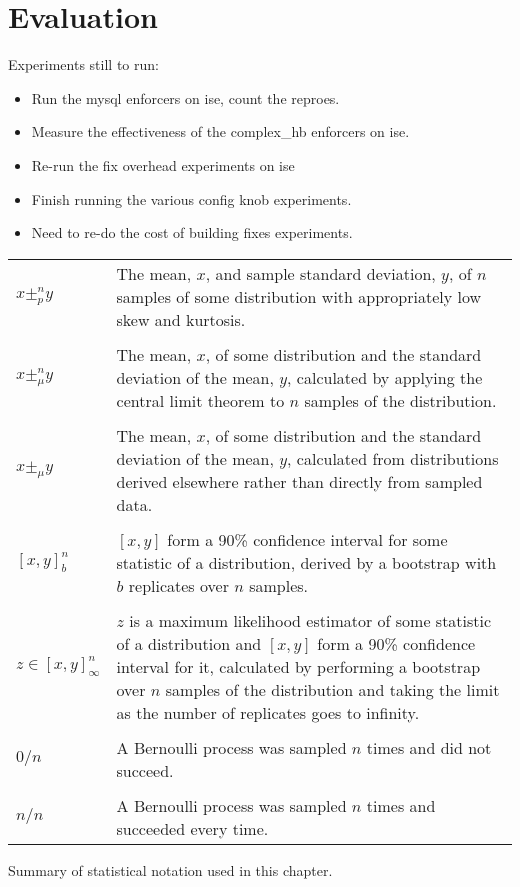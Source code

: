 \newcommand{\biggraph}[1]{}

\chapter{Evaluation}
\label{chapter:eval}

Experiments still to run:

\begin{itemize}
\item Run the mysql enforcers on ise, count the reproes.
\item Measure the effectiveness of the complex\_hb enforcers on ise.
\item Re-run the fix overhead experiments on ise
\item Finish running the various config knob experiments.
\item Need to re-do the cost of building fixes experiments.
\end{itemize}

\begin{sanefig}
  \begin{tabular}{lp{12.7cm}}
    $x \pm^n_p y$ & The mean, $x$, and sample standard deviation, $y$, of $n$ samples of some distribution with appropriately low skew and kurtosis.\\
    & \\
    $x \pm^n_\mu y$ & The mean, $x$, of some distribution and the standard deviation of the mean, $y$, calculated by applying the central limit theorem to $n$ samples of the distribution.\\
    & \\
    $x \pm_\mu y$ & The mean, $x$, of some distribution and the standard deviation of the mean, $y$, calculated from distributions derived elsewhere rather than directly from sampled data.\\
    & \\
    $[x,y]^n_b$ & $[x,y]$ form a 90\% confidence interval for some statistic of a distribution, derived by a bootstrap with $b$ replicates over $n$ samples. \\
    & \\
    $z \in [x,y]^n_\infty$ & $z$ is a maximum likelihood estimator of some statistic of a distribution and $[x,y]$ form a 90\% confidence interval for it, calculated by performing a bootstrap over $n$ samples of the distribution and taking the limit as the number of replicates goes to infinity.\\
    & \\
    $0/n$ & A Bernoulli process was sampled $n$ times and did not succeed. \\
    &\\
    $n/n$ & A Bernoulli process was sampled $n$ times and succeeded every time. \\
  \end{tabular}
  \caption{Summary of statistical notation used in this chapter.}
\end{sanefig}

